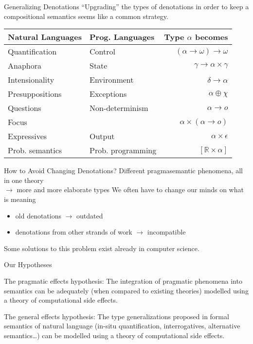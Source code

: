\documentclass{beamer}
\begin{document}
\begin{frame}{Generalizing Denotations}
  ``Upgrading'' the types of denotations in order to keep a compositional
  semantics seems like a common strategy.
  \vfill
  \begin{tabular}{llr}
    Natural Languages & Prog. Languages & Type $\alpha$ becomes \\
    \hline
    Quantification & Control &
    $(\alpha \to \omega) \to \omega$ \\
    Anaphora & State &
    $\gamma \to \alpha \times \gamma$ \\
    Intensionality & Environment &
    $\delta \to \alpha$ \\
    Presuppositions & Exceptions &
    $\alpha \oplus \chi$ \\
    Questions & Non-determinism &
    $\alpha \to o$ \\
    Focus & &
    $\alpha \times (\alpha \to o)$ \\
    Expressives & Output &
    $\alpha \times \epsilon$ \\
    Prob. semantics & Prob. programming &
    $[\mathbb{R} \times \alpha]$ \\
  \end{tabular}
\end{frame}

\begin{frame}{How to Avoid Changing Denotations?}
  Different pragmasemantic phenomena, all in one theory \\
    $\rightarrow$ more and more elaborate types
  \vfill
  \pause
  We often have to change our minds on what is meaning
  \begin{itemize}
  \item old denotations $\rightarrow$ outdated
  \item denotations from other strands of work $\rightarrow$ incompatible
  \end{itemize}
  \pause
  \vfill
  Some solutions to this problem exist already in computer science.
\end{frame}


\begin{frame}{Our Hypotheses}
  
  \begin{block}{The pragmatic effects hypothesis:}
  The integration of pragmatic phenomena into semantics can be adequately
  (when compared to existing theories) modelled using a theory of
  computational side effects.
  \end{block}
  \vfill
  \begin{block}{The general effects hypothesis:}
  The type generalizations proposed in formal semantics of natural language
  (in-situ quantification, interrogatives, alternative semantics\ldots) can
  be modelled using a theory of computational side effects.
  \end{block}
\end{frame}
\end{document}
